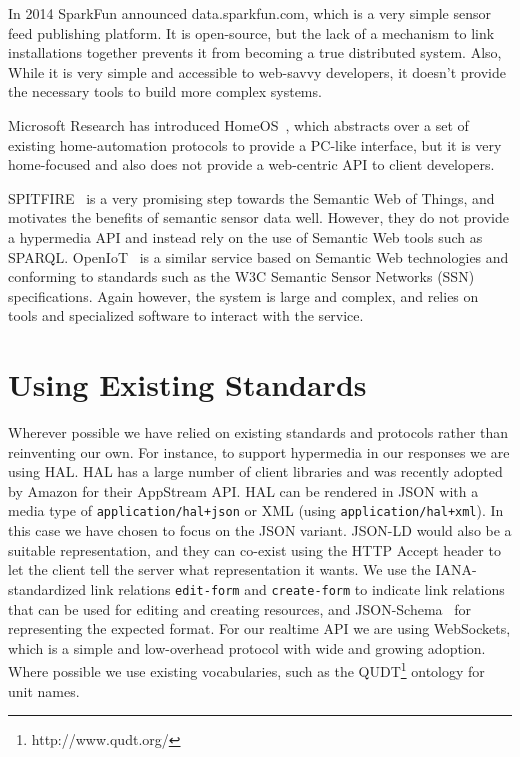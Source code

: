 \documentclass{acm_proc_article-sp}
\begin{document}
In 2014 SparkFun announced data.sparkfun.com, which is a very simple sensor
feed publishing platform. It is open-source, but the lack of a mechanism to
link installations together prevents it from becoming a true distributed
system.  Also, While it is very simple and accessible to web-savvy developers,
it doesn't provide the necessary tools to build more complex systems.

Microsoft Research has introduced HomeOS~\cite{homeos}, which abstracts over a
set of existing home-automation protocols to provide a PC-like interface, but
it is very home-focused and also does not provide a web-centric API to client
developers.

SPITFIRE~\cite{spitfire} is a very promising step towards the Semantic Web of
Things, and motivates the benefits of semantic sensor data well.  However, they
do not provide a hypermedia API and instead rely on the use of Semantic Web
tools such as SPARQL. OpenIoT~\cite{openiot} is a similar service based on
Semantic Web technologies and conforming to standards such as the W3C Semantic
Sensor Networks (SSN) specifications. Again however, the system is large and
complex, and relies on tools and specialized software to interact with the
service.

\section{Using Existing Standards}

Wherever possible we have relied on existing standards and protocols rather
than reinventing our own. For instance, to support hypermedia in our responses
we are using HAL. HAL has a large number of client libraries and was recently
adopted by Amazon for their AppStream API.  HAL can be rendered in JSON with a
media type of \texttt{application/hal+json} or XML (using
\mbox{\texttt{application/hal+xml}}). In this case we have chosen to focus on
the JSON variant. JSON-LD would also be a suitable representation, and they can
co-exist using the HTTP Accept header to let the client tell the server what
representation it wants. We use the IANA-standardized link relations
\texttt{edit-form} and \texttt{create-form} to indicate link relations that can
be used for editing and creating resources, and
JSON-Schema~\cite{json-schema-draft} for representing the expected format. For
our realtime API we are using WebSockets, which is a simple and low-overhead
protocol with wide and growing adoption. Where possible we use existing
vocabularies, such as the QUDT\footnote{http://www.qudt.org/} ontology for unit
names.
\end{document}
